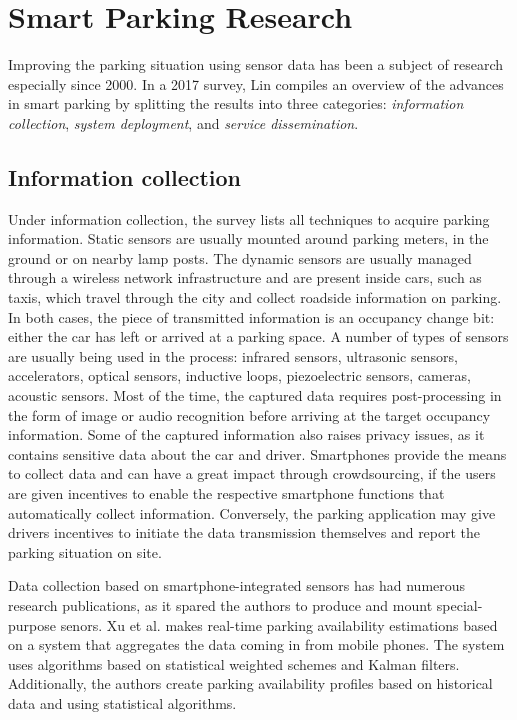 	\section{Smart Parking Research}
	\label{sec:spresearch}
	Improving the parking situation using sensor data has been a subject of research especially since 2000. In a 2017 survey\cite{lin}\cite{lin2}, Lin compiles an overview of the advances in smart parking by splitting the results into three categories: \textit{information collection}, \textit{system deployment}, and \textit{service dissemination}.
	
	\subsection{Information collection}
	Under information collection, the survey lists all techniques to acquire parking information. Static sensors are usually mounted around parking meters, in the ground or on nearby lamp posts. The dynamic sensors are usually managed through a wireless network infrastructure and are present inside cars, such as taxis, which travel through the city and collect roadside information on parking. In both cases, the piece of transmitted information is an occupancy change bit: either the car has left or arrived at a parking space. A number of types of sensors are usually being used in the process: infrared sensors, ultrasonic sensors, accelerators, optical sensors, inductive loops, piezoelectric sensors, cameras, acoustic sensors. Most of the time, the captured data requires post-processing in the form of image or audio recognition before arriving at the target occupancy information. Some of the captured information also raises privacy issues, as it contains sensitive data about the car and driver. Smartphones provide the means to collect data and can have a great impact through crowdsourcing, if the users are given incentives to enable the respective smartphone functions that automatically collect information. Conversely, the parking application may give drivers incentives to initiate the data transmission themselves and report the parking situation on site. 
	
	Data collection based on smartphone-integrated sensors has had numerous research publications, as it spared the authors to produce and mount special-purpose senors. Xu et al.\cite{xu} makes real-time parking availability estimations based on a system that aggregates the data coming in from mobile phones. The system uses algorithms based on statistical weighted schemes and Kalman filters. Additionally, the authors create parking availability profiles based on historical data and using statistical algorithms. 
	
